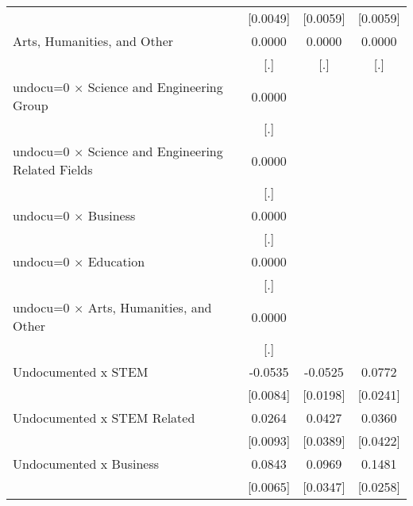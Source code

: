 \begin{table}[htbp]
\begin{tabular}{l*{3}{c}}
                    &    [0.0049]         &    [0.0059]         &    [0.0059]         \\
\addlinespace
Arts, Humanities, and Other&      0.0000         &      0.0000         &      0.0000         \\
                    &         [.]         &         [.]         &         [.]         \\
\addlinespace
undocu=0 $\times$ Science and Engineering Group&      0.0000         &                     &                     \\
                    &         [.]         &                     &                     \\
\addlinespace
undocu=0 $\times$ Science and Engineering Related Fields&      0.0000         &                     &                     \\
                    &         [.]         &                     &                     \\
\addlinespace
undocu=0 $\times$ Business&      0.0000         &                     &                     \\
                    &         [.]         &                     &                     \\
\addlinespace
undocu=0 $\times$ Education&      0.0000         &                     &                     \\
                    &         [.]         &                     &                     \\
\addlinespace
undocu=0 $\times$ Arts, Humanities, and Other&      0.0000         &                     &                     \\
                    &         [.]         &                     &                     \\
\addlinespace
Undocumented x STEM &     -0.0535\sym{***}&     -0.0525\sym{**} &      0.0772\sym{***}\\
                    &    [0.0084]         &    [0.0198]         &    [0.0241]         \\
\addlinespace
Undocumented x STEM Related&      0.0264\sym{***}&      0.0427         &      0.0360         \\
                    &    [0.0093]         &    [0.0389]         &    [0.0422]         \\
\addlinespace
Undocumented x Business&      0.0843\sym{***}&      0.0969\sym{***}&      0.1481\sym{***}\\
                    &    [0.0065]         &    [0.0347]         &    [0.0258]         \\

\end{tabular}
\end{table}
